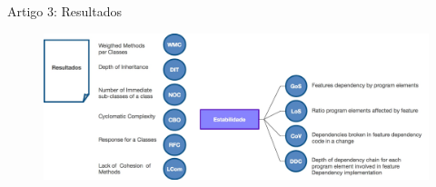 
\begin{frame}{Artigo 3: Resultados}
  
          
  \begin{figure}[hbt]
    \includegraphics[scale=0.25]{imagens/artigo3-resultados-1.jpg}
  \end{figure}

%   

\end{frame}